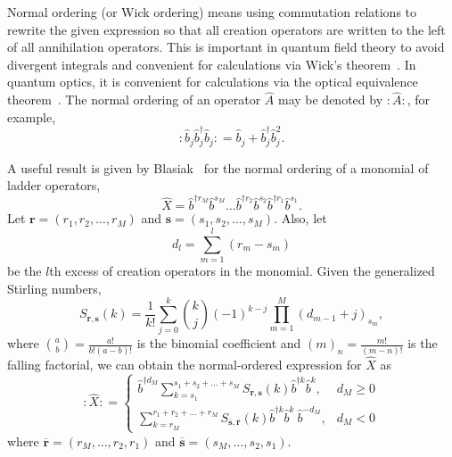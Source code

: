 \documentclass[5p, twocolumn, 10pt, sort&compress]{elsarticle}
\newcounter{bla}
\newcommand{\bop}{\hat{b}}
\newcommand{\bdag}{\bop^\dagger}
\newcommand{\bdagn}[1]{\bop^{\dagger {#1}}}
\begin{document}
Normal ordering (or Wick ordering) means using commutation relations to rewrite the given expression so that all creation operators are written to the left of all annihilation operators.  This is important in quantum field theory to avoid divergent integrals and convenient for calculations via Wick's theorem~\cite{lancaster_quantum_2014}.  In quantum optics, it is convenient for calculations via the optical equivalence theorem~\cite{gerry_introductory_2005}.  The normal ordering of an operator $\hat{A}$ may be denoted by $:\mathrel{\hat{A}}:$, for example,
\begin{equation}\label{eq:normal_ordering_example}
    :\mathrel{\bop_j\bdag_j\bop_j}: = \bop_j+\bdag_j\bop_j^2 .
\end{equation}

A useful result is given by Blasiak~\cite{blasiak_combinatorics_2005, Mendez_2005} for the normal ordering of a monomial of ladder operators, 
\begin{equation}
    \hat{X} = \bdagn{r_M}\bop^{s_M}\dots \bdagn{r_2}\bop^{s_2}\bdagn{r_1}\bop^{s_1} .
\end{equation} 
Let $\bm{r}=\left(r_1,r_2,\dots,r_M\right)$ and $\bm{s}=\left(s_1,s_2,\dots,s_M\right)$.  Also, let 
\begin{equation}
    d_l = \sum_{m=1}^l\left(r_m-s_m\right)
\end{equation}
be the $l$th excess of creation operators in the monomial.  Given  the generalized Stirling numbers,
\begin{equation}
    S_{\bm{r},\bm{s}}(k) = \frac{1}{k!}\sum_{j=0}^k \binom{k}{j}\left(-1\right)^{k-j}\prod_{m=1}^M \left(d_{m-1}+j\right)_{s_m},
\end{equation}
where $\binom{a}{b}=\frac{a!}{b!(a-b)!}$ is the binomial coefficient and $(m)_n=\frac{m!}{(m-n)!}$ is the falling factorial, we can obtain the normal-ordered expression for $\hat{X}$ as 
\begin{equation}\label{eq:Blasiak}
    :\mathrel{\hat{X}}: = 
    \begin{cases}\displaystyle
        \bdagn{d_M}\sum_{k=s_1}^{s_1+s_2+\dots+s_M} S_{\bm{r},\bm{s}}(k)\bdagn{k}\bop^k,
        &
        d_M \geq 0
        \\
        \displaystyle
        \sum_{k=r_M}^{r_1+r_2+\dots+r_M} S_{\overline{\bm{s}},\overline{\bm{r}}}(k)\bdagn{k}\bop^k\ \bop^{-d_M},
        &
        d_M<0
    \end{cases}
\end{equation}
where $\overline{\bm{r}}=\left(r_M,\dots,r_2,r_1\right)$ and $\overline{\bm{s}}=\left(s_M,\dots,s_2,s_1\right)$. 
\end{document}
